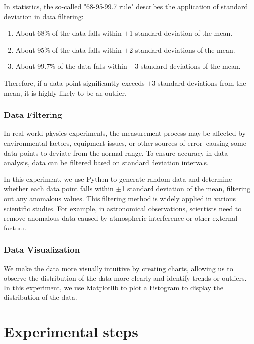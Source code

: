 \documentclass[12pt,a4paper]{article}
\begin{document}
\begin{CJK}{UTF8}{bkai}
In statistics, the so-called "68-95-99.7 rule" describes the application of standard deviation in data filtering:

\begin{enumerate}
    \item About 68\% of the data falls within $\pm$1 standard deviation of the mean.
    \item About 95\% of the data falls within $\pm$2 standard deviations of the mean.
    \item About 99.7\% of the data falls within $\pm$3 standard deviations of the mean.
\end{enumerate}
Therefore, if a data point significantly exceeds $\pm$3 standard deviations from the mean, it is highly likely to be an outlier.

\subsubsection{Data Filtering}
\hfill

In real-world physics experiments, the measurement process may be affected by environmental factors, equipment issues, or other sources of error, causing some data points to deviate from the normal range. To ensure accuracy in data analysis, data can be filtered based on standard deviation intervals.

In this experiment, we use Python to generate random data and determine whether each data point falls within $\pm$1 standard deviation of the mean, filtering out any anomalous values. This filtering method is widely applied in various scientific studies. For example, in astronomical observations, scientists need to remove anomalous data caused by atmospheric interference or other external factors.

\subsubsection{Data Visualization}
\hfill

We make the data more visually intuitive by creating charts, allowing us to observe the distribution of the data more clearly and identify trends or outliers. In this experiment, we use Matplotlib to plot a histogram to display the distribution of the data.

\clearpage
\section{Experimental steps}


\end{CJK}
\end{document}
